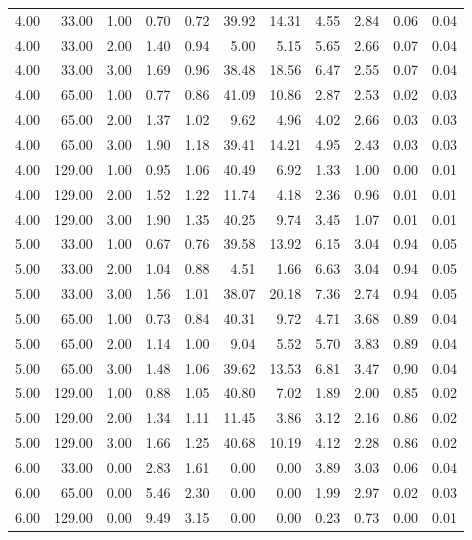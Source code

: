 \begin{table}[ht]
\begin{tabular}{rrrrrrrrrrr}
  4.00 & 33.00 & 1.00 & 0.70 & 0.72 & 39.92 & 14.31 & 4.55 & 2.84 & 0.06 & 0.04 \\ 
  4.00 & 33.00 & 2.00 & 1.40 & 0.94 & 5.00 & 5.15 & 5.65 & 2.66 & 0.07 & 0.04 \\ 
  4.00 & 33.00 & 3.00 & 1.69 & 0.96 & 38.48 & 18.56 & 6.47 & 2.55 & 0.07 & 0.04 \\ 
  4.00 & 65.00 & 1.00 & 0.77 & 0.86 & 41.09 & 10.86 & 2.87 & 2.53 & 0.02 & 0.03 \\ 
  4.00 & 65.00 & 2.00 & 1.37 & 1.02 & 9.62 & 4.96 & 4.02 & 2.66 & 0.03 & 0.03 \\ 
  4.00 & 65.00 & 3.00 & 1.90 & 1.18 & 39.41 & 14.21 & 4.95 & 2.43 & 0.03 & 0.03 \\ 
  4.00 & 129.00 & 1.00 & 0.95 & 1.06 & 40.49 & 6.92 & 1.33 & 1.00 & 0.00 & 0.01 \\ 
  4.00 & 129.00 & 2.00 & 1.52 & 1.22 & 11.74 & 4.18 & 2.36 & 0.96 & 0.01 & 0.01 \\ 
  4.00 & 129.00 & 3.00 & 1.90 & 1.35 & 40.25 & 9.74 & 3.45 & 1.07 & 0.01 & 0.01 \\ 
  5.00 & 33.00 & 1.00 & 0.67 & 0.76 & 39.58 & 13.92 & 6.15 & 3.04 & 0.94 & 0.05 \\ 
  5.00 & 33.00 & 2.00 & 1.04 & 0.88 & 4.51 & 1.66 & 6.63 & 3.04 & 0.94 & 0.05 \\ 
  5.00 & 33.00 & 3.00 & 1.56 & 1.01 & 38.07 & 20.18 & 7.36 & 2.74 & 0.94 & 0.05 \\ 
  5.00 & 65.00 & 1.00 & 0.73 & 0.84 & 40.31 & 9.72 & 4.71 & 3.68 & 0.89 & 0.04 \\ 
  5.00 & 65.00 & 2.00 & 1.14 & 1.00 & 9.04 & 5.52 & 5.70 & 3.83 & 0.89 & 0.04 \\ 
  5.00 & 65.00 & 3.00 & 1.48 & 1.06 & 39.62 & 13.53 & 6.81 & 3.47 & 0.90 & 0.04 \\ 
  5.00 & 129.00 & 1.00 & 0.88 & 1.05 & 40.80 & 7.02 & 1.89 & 2.00 & 0.85 & 0.02 \\ 
  5.00 & 129.00 & 2.00 & 1.34 & 1.11 & 11.45 & 3.86 & 3.12 & 2.16 & 0.86 & 0.02 \\ 
  5.00 & 129.00 & 3.00 & 1.66 & 1.25 & 40.68 & 10.19 & 4.12 & 2.28 & 0.86 & 0.02 \\ 
  6.00 & 33.00 & 0.00 & 2.83 & 1.61 & 0.00 & 0.00 & 3.89 & 3.03 & 0.06 & 0.04 \\ 
  6.00 & 65.00 & 0.00 & 5.46 & 2.30 & 0.00 & 0.00 & 1.99 & 2.97 & 0.02 & 0.03 \\ 
  6.00 & 129.00 & 0.00 & 9.49 & 3.15 & 0.00 & 0.00 & 0.23 & 0.73 & 0.00 & 0.01 \\ 
   \hline
\end{tabular}
\end{table}
